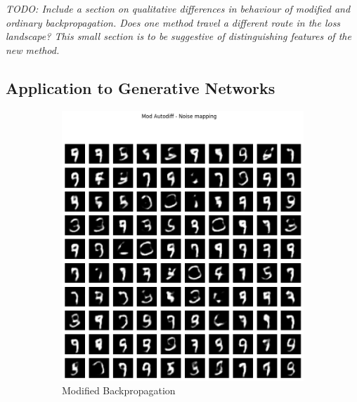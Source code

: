 \documentclass{article}
\begin{document}
\textit{TODO: Include a section on qualitative differences in behaviour of modified and ordinary backpropagation. Does one method travel a different route in the loss landscape? This small section is to be suggestive of distinguishing features of the new method.}

\subsection{Application to Generative Networks}

\begin{figure}[H]
  \centering
  \begin{subfigure}{.5\textwidth}
    \centering
    \includegraphics[width=0.9\linewidth]{./resources/mnist-mod-autodiff-generative.png}
    \caption{Modified Backpropagation}
  \end{subfigure}%
  \begin{subfigure}{.5\textwidth}
    \centering

\end{subfigure}
\end{figure}
\end{document}
